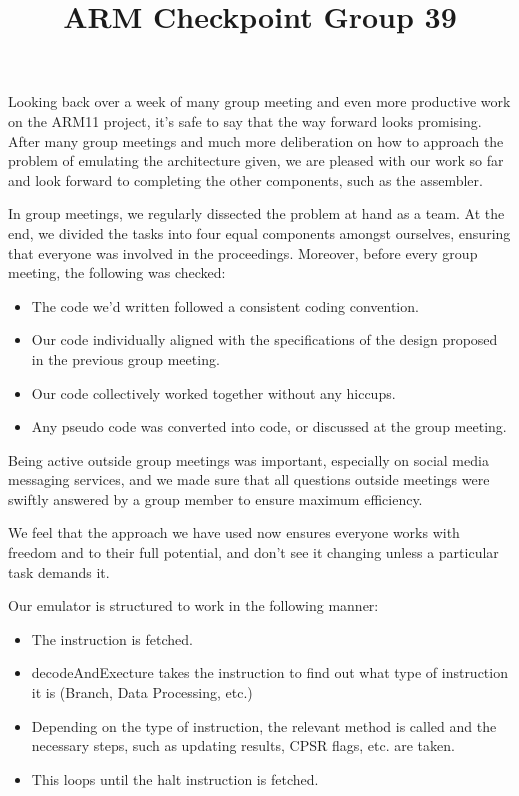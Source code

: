 \documentclass[11pt]{article}
\begin{document}
\title{ARM Checkpoint Group 39}

\maketitle

Looking back over a week of many group meeting and even more productive work on the ARM11 project, it’s safe to say that the way forward looks promising. After many group meetings and much more deliberation on how to approach the problem of emulating the architecture given, we are pleased with our work so far and look forward to completing the other components, such as the assembler.

In group meetings, we regularly dissected the problem at hand as a team. At the end, we divided the tasks into four equal components amongst ourselves, ensuring that everyone was involved in the proceedings. Moreover, before every group meeting, the following was checked:

\begin{itemize}

    \item The code we’d written followed a consistent coding convention.
    \item Our code individually aligned with the specifications of the design proposed in the previous group meeting.
    \item Our code collectively worked together without any hiccups.
    \item Any pseudo code was converted into code, or discussed at the group meeting.

\end{itemize}

Being active outside group meetings was important, especially on social media messaging services, and we made sure that all questions outside meetings were swiftly answered by a group member to ensure maximum efficiency. 

We feel that the approach we have used now ensures everyone works with freedom and to their full potential, and don’t see it changing unless a particular task demands it.

Our emulator is structured to work in the following manner:

\begin{itemize}

    \item The instruction is fetched.
    \item decodeAndExecture takes the instruction to find out what type of instruction it is (Branch, Data Processing, etc.)
    \item Depending on the type of instruction, the relevant method is called and the necessary steps, such as updating results, CPSR flags, etc. are taken.
    \item This loops until the halt instruction is fetched.

\end{itemize}
\end{document}
